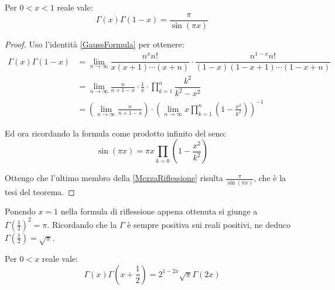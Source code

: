 \begin{theorem}
\label{Riflessione}
Per $0<x<1$ reale vale:
\begin{equation*}
	\Gamma(x)\Gamma(1-x)=\frac{\pi}{\sin(\pi x)}
\end{equation*}

\end{theorem}

\begin{proof}
Uso l'identità \cref{GaussFormula} per ottenere:
\begin{equation}
\label{MezzaRiflessione}
\begin{split}
\Gamma(x)\Gamma(1-x) & = \lim_{n\to\infty} \dfrac{n^xn!}{x(x+1)\cdots (x+n)} \cdot \dfrac{n^{1-x}n!}{(1-x)(1-x+1)\cdots (1-x+n)}\\
 & =\lim_{n\to\infty} \frac{n}{n+1-x} \cdot \frac{1}{x} \cdot \prod_{k=1}^{n}\dfrac{k^2}{k^2-x^2} \\
  & =\left(\lim_{n\to\infty} \frac{n}{n+1-x} \right) \cdot \left( \lim_{n\to\infty} x \prod_{k=1}^{n}\left(1-\frac{x^2}{k^2}\right) \right)^{-1}
\end{split}
\end{equation}

Ed ora ricordando la formula come prodotto infinito del seno:
\begin{equation*}
	\sin(\pi x)=\pi x \prod_{k=0} \left(1-\frac{x^2}{k^2}\right)
\end{equation*}

Ottengo che l'ultimo membro della \cref{MezzaRiflessione} risulta $\frac{\pi}{\sin(\pi x)}$, che è la tesi del teorema.


\end{proof}

\begin{remark}
Ponendo $x=1$ nella formula di riflessione appena ottenuta si giunge a $\Gamma\left(\frac12\right)^2=\pi$. 
Ricordando che la $\Gamma$ è sempre positiva sui reali positivi, ne deduco $\Gamma\left(\frac12\right)=\sqrt\pi$.
\end{remark}


\begin{theorem}
\label{Duplicazione}
Per $0<x$ reale vale:
\begin{equation*}
	\Gamma(x)\Gamma\left(x+\frac12\right)=2^{1-2x}\sqrt{\pi}\Gamma(2x)
\end{equation*}

\end{theorem}

